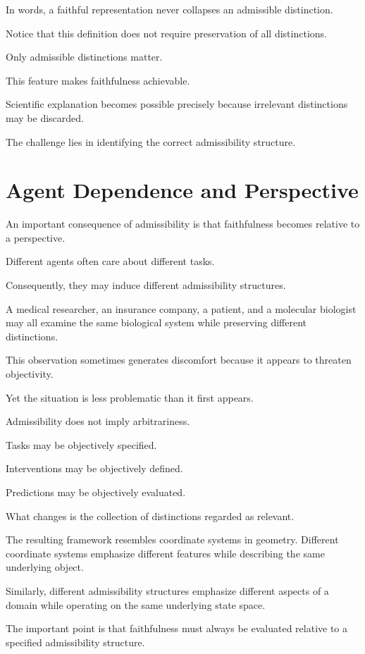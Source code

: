 \documentclass[11pt,oneside,openany]{book}
\begin{document}
In words, a faithful representation never collapses an admissible distinction.

Notice that this definition does not require preservation of all distinctions.

Only admissible distinctions matter.

This feature makes faithfulness achievable.

Scientific explanation becomes possible precisely because irrelevant distinctions may be discarded.

The challenge lies in identifying the correct admissibility structure.

\section{Agent Dependence and Perspective}

An important consequence of admissibility is that faithfulness becomes relative to a perspective.

Different agents often care about different tasks.

Consequently, they may induce different admissibility structures.

A medical researcher, an insurance company, a patient, and a molecular biologist may all examine the same biological system while preserving different distinctions.

This observation sometimes generates discomfort because it appears to threaten objectivity.

Yet the situation is less problematic than it first appears.

Admissibility does not imply arbitrariness.

Tasks may be objectively specified.

Interventions may be objectively defined.

Predictions may be objectively evaluated.

What changes is the collection of distinctions regarded as relevant.

The resulting framework resembles coordinate systems in geometry. Different coordinate systems emphasize different features while describing the same underlying object.

Similarly, different admissibility structures emphasize different aspects of a domain while operating on the same underlying state space.

The important point is that faithfulness must always be evaluated relative to a specified admissibility structure.
\end{document}

